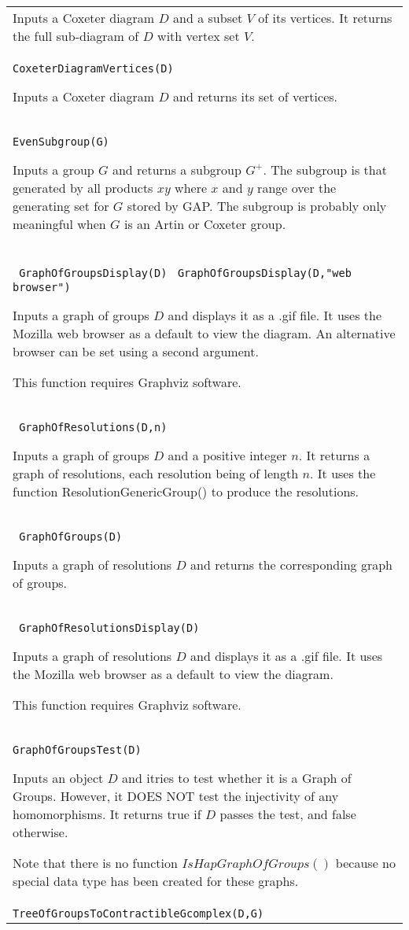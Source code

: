 \documentclass[a4paper,11pt]{report}
\begin{document}
{\begin{center}
\begin{tabular}{|l|}
 Inputs a Coxeter diagram $D$ and a subset $V$ of its vertices. It returns the full sub-diagram of $D$ with vertex set $V$. \\
 \index{CoxeterDiagramVertices} \texttt{CoxeterDiagramVertices(D) } 

 Inputs a Coxeter diagram $D$ and returns its set of vertices. \\
 \index{EvenSubgroup} \texttt{EvenSubgroup(G) } 

 Inputs a group $G$ and returns a subgroup $G^+$. The subgroup is that generated by all products $xy$ where $x$ and $y$ range over the generating set for $G$ stored by GAP. The subgroup is probably only meaningful when $G$ is an Artin or Coxeter group. \\
 \index{GraphOfGroupsDisplay} \texttt{ GraphOfGroupsDisplay(D) } \texttt{GraphOfGroupsDisplay(D,"web browser") } 

 Inputs a graph of groups $D$ and displays it as a .gif file. It uses the Mozilla web browser as a default
to view the diagram. An alternative browser can be set using a second
argument. 

 This function requires Graphviz software. \\
 \index{GraphOfResolutions} \texttt{ GraphOfResolutions(D,n) } 

 Inputs a graph of groups $D$ and a positive integer $n$. It returns a graph of resolutions, each resolution being of length $n$. It uses the function ResolutionGenericGroup() to produce the resolutions. \\
 \index{GraphOfGroups} \texttt{ GraphOfGroups(D) } 

 Inputs a graph of resolutions $D$ and returns the corresponding graph of groups. \\
 \index{GraphOfResolutionsDisplay} \texttt{ GraphOfResolutionsDisplay(D) } 

 Inputs a graph of resolutions $D$ and displays it as a .gif file. It uses the Mozilla web browser as a default
to view the diagram. 

 This function requires Graphviz software. \\
 \index{GraphOfGroupsTest} \texttt{GraphOfGroupsTest(D) } 

 Inputs an object $D$ and itries to test whether it is a Graph of Groups. However, it DOES NOT test
the injectivity of any homomorphisms. It returns true if $D$ passes the test, and false otherwise. 

 Note that there is no function $IsHapGraphOfGroups()$ because no special data type has been created for these graphs. \\
 \index{TreeOfGroupsToContractibleGcomplex} \texttt{TreeOfGroupsToContractibleGcomplex(D,G) } 


\end{tabular}
\end{center}}
\end{document}
